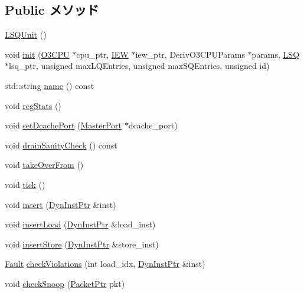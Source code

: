 \subsection*{Public メソッド}
\begin{DoxyCompactItemize}
\item 
\hyperlink{classLSQUnit_a0b23136c4d1c97aab007aa60e707763b}{LSQUnit} ()
\item 
void \hyperlink{classLSQUnit_a45b3b65ba551c17c3b200db265611a4c}{init} (\hyperlink{classLSQUnit_a44622cf06940413482836cb62931ac3f}{O3CPU} $\ast$cpu\_\-ptr, \hyperlink{classLSQUnit_a23f60a4095b5240dfcb18a4ec40210a9}{IEW} $\ast$iew\_\-ptr, DerivO3CPUParams $\ast$params, \hyperlink{classLSQ}{LSQ} $\ast$lsq\_\-ptr, unsigned maxLQEntries, unsigned maxSQEntries, unsigned id)
\item 
std::string \hyperlink{classLSQUnit_a37627d5d5bba7f4a8690c71c2ab3cb07}{name} () const 
\item 
void \hyperlink{classLSQUnit_a4dc637449366fcdfc4e764cdf12d9b11}{regStats} ()
\item 
void \hyperlink{classLSQUnit_a8d77cc755c7a424f4eb80130fb627012}{setDcachePort} (\hyperlink{classMasterPort}{MasterPort} $\ast$dcache\_\-port)
\item 
void \hyperlink{classLSQUnit_a0240eb42fa57fe5d3788093f62b77347}{drainSanityCheck} () const 
\item 
void \hyperlink{classLSQUnit_a8674059ce345e23aac5086b2c3e24a43}{takeOverFrom} ()
\item 
void \hyperlink{classLSQUnit_a873dd91783f9efb4a590aded1f70d6b0}{tick} ()
\item 
void \hyperlink{classLSQUnit_a773e88db1aa010c3755e603493bf40ec}{insert} (\hyperlink{classLSQUnit_a028ce10889c5f6450239d9e9a7347976}{DynInstPtr} \&inst)
\item 
void \hyperlink{classLSQUnit_ad22b3ecafed2bcd9c59fcab049a1cb98}{insertLoad} (\hyperlink{classLSQUnit_a028ce10889c5f6450239d9e9a7347976}{DynInstPtr} \&load\_\-inst)
\item 
void \hyperlink{classLSQUnit_a6a4b4e51bfff3639932ebaba45e8a282}{insertStore} (\hyperlink{classLSQUnit_a028ce10889c5f6450239d9e9a7347976}{DynInstPtr} \&store\_\-inst)
\item 
\hyperlink{classRefCountingPtr}{Fault} \hyperlink{classLSQUnit_a15239c5725d8744a793c867193e4bce7}{checkViolations} (int load\_\-idx, \hyperlink{classLSQUnit_a028ce10889c5f6450239d9e9a7347976}{DynInstPtr} \&inst)
\item 
void \hyperlink{classLSQUnit_a35b89a864d3af33a4b045b7fe0aa6b5a}{checkSnoop} (\hyperlink{classPacket}{PacketPtr} pkt)

\end{DoxyCompactItemize}
